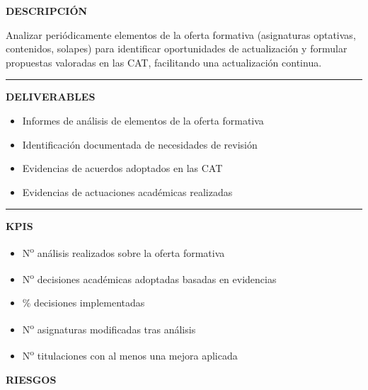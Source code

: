 \documentclass[11pt,a4paper]{scrreprt}
\newcommand{\fieldlabel}[1]{%
  {\footnotesize\sffamily\bfseries\color{mutedcolor}\MakeUppercase{#1}}\par\nopagebreak[4]
}
\newcommand{\fieldsep}{\vspace{3pt}\noindent\textcolor{bordercolor}{\rule{\linewidth}{0.4pt}}\vspace{3pt}\par}
\begin{document}
\begin{tcolorbox}[pabox={aacolor}{PA5.1 \enspace\textbullet\enspace Revisión y propuesta de actualización de la oferta formativa}]

\fieldlabel{Descripci\'on}
{\small Analizar periódicamente elementos de la oferta formativa (asignaturas optativas, contenidos, solapes) para identificar oportunidades de actualización y formular propuestas valoradas en las CAT, facilitando una actualización continua.}\par
\fieldsep
\fieldlabel{Deliverables}
{\small \begin{itemize}[noitemsep,topsep=2pt]
\item Informes de análisis de elementos de la oferta formativa
\item Identificación documentada de necesidades de revisión
\item Evidencias de acuerdos adoptados en las CAT
\item Evidencias de actuaciones académicas realizadas
\end{itemize}}\par
\fieldsep
\fieldlabel{KPIs}
{\small \begin{itemize}[noitemsep,topsep=2pt]
\item N\textsuperscript{o} análisis realizados sobre la oferta formativa
\item N\textsuperscript{o} decisiones académicas adoptadas basadas en evidencias
\item \% decisiones implementadas
\item N\textsuperscript{o} asignaturas modificadas tras análisis
\item N\textsuperscript{o} titulaciones con al menos una mejora aplicada
\end{itemize}}\par
\end{tcolorbox}
\begin{tcolorbox}[riskbox]
{\footnotesize\sffamily\bfseries\color{red!50!black} RIESGOS}\par{}
\end{tcolorbox}
\end{document}
